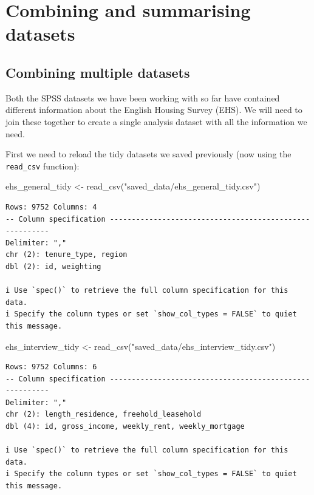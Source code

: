 \documentclass[
  letterpaper,
  DIV=11,
  numbers=noendperiod]{scrreprt}
\newenvironment{Shaded}{\begin{snugshade}}{\end{snugshade}}
\newcommand{\FunctionTok}[1]{\textcolor[rgb]{0.28,0.35,0.67}{#1}}
\newcommand{\NormalTok}[1]{\textcolor[rgb]{0.00,0.23,0.31}{#1}}
\newcommand{\OtherTok}[1]{\textcolor[rgb]{0.00,0.23,0.31}{#1}}
\newcommand{\StringTok}[1]{\textcolor[rgb]{0.13,0.47,0.30}{#1}}
\begin{document}

\chapter{Combining and summarising
datasets}\label{combining-and-summarising-datasets}

\section{Combining multiple datasets}\label{combining-multiple-datasets}

Both the SPSS datasets we have been working with so far have contained
different information about the English Housing Survey (EHS). We will
need to join these together to create a single analysis dataset with all
the information we need.

First we need to reload the tidy datasets we saved previously (now using
the \texttt{read\_csv} function):

\begin{Shaded}
\begin{Highlighting}[]
\NormalTok{ehs\_general\_tidy }\OtherTok{\textless{}{-}} \FunctionTok{read\_csv}\NormalTok{(}\StringTok{"saved\_data/ehs\_general\_tidy.csv"}\NormalTok{)}
\end{Highlighting}
\end{Shaded}

\begin{verbatim}
Rows: 9752 Columns: 4
-- Column specification --------------------------------------------------------
Delimiter: ","
chr (2): tenure_type, region
dbl (2): id, weighting

i Use `spec()` to retrieve the full column specification for this data.
i Specify the column types or set `show_col_types = FALSE` to quiet this message.
\end{verbatim}

\begin{Shaded}
\begin{Highlighting}[]
\NormalTok{ehs\_interview\_tidy }\OtherTok{\textless{}{-}} \FunctionTok{read\_csv}\NormalTok{(}\StringTok{"saved\_data/ehs\_interview\_tidy.csv"}\NormalTok{)}
\end{Highlighting}
\end{Shaded}

\begin{verbatim}
Rows: 9752 Columns: 6
-- Column specification --------------------------------------------------------
Delimiter: ","
chr (2): length_residence, freehold_leasehold
dbl (4): id, gross_income, weekly_rent, weekly_mortgage

i Use `spec()` to retrieve the full column specification for this data.
i Specify the column types or set `show_col_types = FALSE` to quiet this message.
\end{verbatim}
\end{document}
